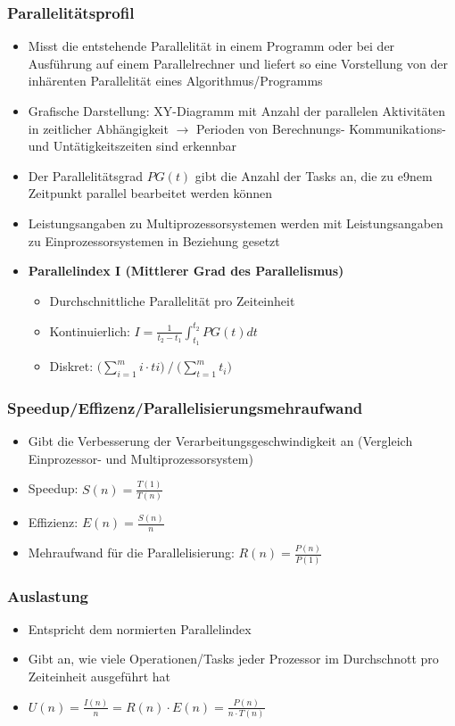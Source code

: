 \subsubsection{Parallelitätsprofil}
\begin{itemize}
	\item Misst die entstehende Parallelität in einem Programm oder bei der Ausführung auf einem Parallelrechner und liefert so eine Vorstellung von der inhärenten Parallelität eines Algorithmus/Programms
	\item Grafische Darstellung: XY-Diagramm mit Anzahl der parallelen Aktivitäten in zeitlicher Abhängigkeit \(\rightarrow\) Perioden von Berechnungs- Kommunikations- und Untätigkeitszeiten sind erkennbar
	\item Der Parallelitätsgrad \(PG(t)\) gibt die Anzahl der Tasks an, die zu e9nem Zeitpunkt parallel bearbeitet werden können
	\item Leistungsangaben zu Multiprozessorsystemen werden mit Leistungsangaben zu Einprozessorsystemen in Beziehung gesetzt
	\item \textbf{Parallelindex I (Mittlerer Grad des Parallelismus)}
	\begin{itemize}
		\item Durchschnittliche Parallelität pro Zeiteinheit
		\item Kontinuierlich: \(I = \frac{1}{t_2-t_1}\int_{t_1}^{t_2}PG(t)dt\)
		\item Diskret: \(\Big(\sum_{i=1}^m i\cdot ti\Big)~/~\Big(\sum_{t=1}^mt_i\Big)\)
	\end{itemize}
\end{itemize}

\subsubsection{Speedup/Effizenz/Parallelisierungsmehraufwand}
\begin{itemize}
	\item Gibt die Verbesserung der Verarbeitungsgeschwindigkeit an (Vergleich Einprozessor- und Multiprozessorsystem)
	\item Speedup: \(S(n)=\frac{T(1)}{T(n)}\)
	\item Effizienz: \(E(n)=\frac{S(n)}{n}\)
	\item Mehraufwand für die Parallelisierung: \(R(n)=\frac{P(n)}{P(1)}\)
\end{itemize}

\subsubsection{Auslastung}
\begin{itemize}
	\item Entspricht dem normierten Parallelindex
	\item Gibt an, wie viele Operationen/Tasks jeder Prozessor im Durchschnott pro Zeiteinheit ausgeführt hat
	\item \(U(n) = \frac{I(n)}{n} = R(n) \cdot E(n) = \frac{P(n)}{n \cdot T(n)}\)
\end{itemize}

